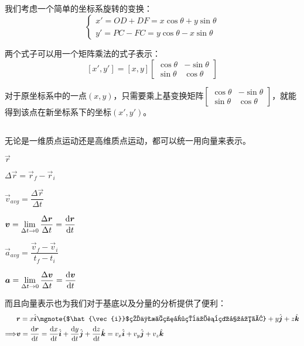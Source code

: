 \subsection[基变换]{}
我们考虑一个简单的坐标系旋转的变换：
\[\begin{cases}
	x'=OD+DF=x\cos\theta+y\sin\theta\\
	y'=PC-FC=y\cos\theta-x\sin\theta
\end{cases}\]

两个式子可以用一个矩阵乘法的式子表示：
\[\left [ x',y' \right ] =\left [ x,y \right ]\begin{bmatrix}
  \cos\theta &-\sin\theta \\
   \sin\theta&\cos\theta
 \end{bmatrix}\]

对于原坐标系中的一点$(x,y)$，只需要乘上基变换矩阵$\begin{bmatrix}
  \cos\theta &-\sin\theta \\
   \sin\theta&\cos\theta
 \end{bmatrix}$，就能得到该点在新坐标系下的坐标$(x',y')$。

 \subsection[质点运动的向量表示法]{}
 无论是一维质点运动还是高维质点运动，都可以统一用向量来表示。
 \begin{Itemize}
  \item {} $\vec{r}$
  \item {} $\Delta\vec{r}=\vec{r}_{f}-\vec{r}_{i}$
  \item {} $\vec{v}_{avg}=\dfrac{\Delta \vec{r}}{\Delta t}$
  \item {} $\displaystyle\vec{v}=\lim_{\Delta t \to 0} \frac{\Delta \vec{r}}{\Delta t}=\frac{\dif \vec{r}}{\dif  t}$
  \item {} $\vec{a}_{avg}=\dfrac{\vec{v}_{f}-\vec{v}_{i}}{t_{f}-t_{i}}$
  \item {} $\displaystyle\vec{a}=\lim_{\Delta t \to 0}\frac{\Delta \vec{v}}{\Delta t}=\frac{\dif \vec{v}}{\dif  t}$
\end{Itemize}

而且向量表示也为我们对于基底以及分量的分析提供了便利：
\begin{equation}
  \begin{aligned}
    &\vec{r} =x\hat{\vec{i}}\mgnote{$\hat{\vec{i}}$的上标符号用于表示基底。} +y\hat{\vec{j}} +z\hat{\vec{k}} \\
\Longrightarrow &\vec{v}=\frac{\dif \vec{r}}{\dif  t}=\frac{\dif  x}{\dif  t}\hat{\vec{i}}+\frac{\dif  y}{\dif  t}\hat{\vec{j}}+\frac{\dif  z}{\dif  t}\hat{\vec{k}}=v_{x}\hat{\vec{i}}+v_{y}\hat{\vec{j}}+v_{z}\hat{\vec{k}}\\
   \end{aligned}
  \nonumber
\end{equation}

